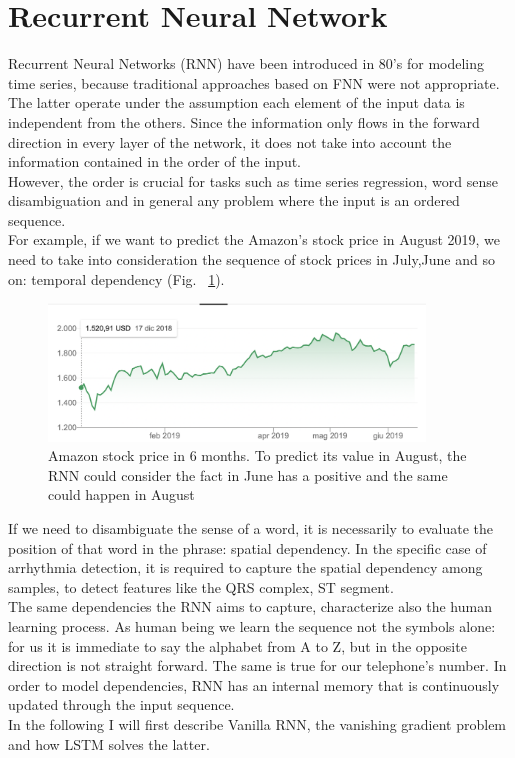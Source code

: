\documentclass[LaM,binding=0.6cm]{sapthesis}
\begin{document}
\section{Recurrent Neural Network}
Recurrent Neural Networks (RNN) have been introduced in 80's for modeling time series, because traditional approaches based on FNN were not appropriate. The latter operate under the assumption each element of the input data is independent from the others. Since the information only flows in the forward direction in every layer of the network, it does not take into account the information contained in the order of the input.\\However, the order is crucial for tasks such as time series regression, word sense disambiguation and in general any problem where the input is an ordered sequence.\\For example, if we want to predict the Amazon's stock price in August 2019, we need to take into consideration the sequence of stock prices in July,June and so on: temporal dependency (Fig. ~\ref{fig:amzsp}).
\begin{figure}[H]  \centering
	\includegraphics[width=100mm,scale=0.7]{amzsp}
	\caption{Amazon stock price in 6 months. To predict its value in August, the RNN could consider the fact in June has a positive and the same could happen in August}
	\label{fig:amzsp}
\end{figure}

If we need to disambiguate the sense of a word, it is necessarily to evaluate the position of that word in the phrase: spatial dependency. In the specific case of arrhythmia detection, it is required to capture the spatial dependency among samples, to detect features like the QRS complex, ST segment.\\The same dependencies the RNN aims to capture, characterize also the human learning process. As human being we learn the sequence not the symbols alone: for us it is immediate to say the alphabet from A to Z, but in the opposite direction is not straight forward. The same is true for our telephone's number. In order to model dependencies, RNN has an internal memory that is continuously updated through the input sequence.\\ In the following I will first describe Vanilla RNN, the vanishing gradient problem and how LSTM solves the latter.
\end{document}
